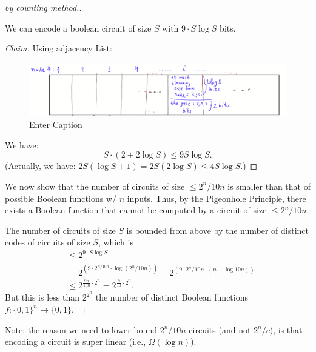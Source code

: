 \begin{proof}[by counting method.]
\mbox{}\\

\begin{claim}
We can encode a boolean circuit of size $S$ with $9\cdot S \log S$ bits.
\end{claim}

\begin{proof}[Claim]
Using adjacency List:
\begin{figure}[H]
    \centering
    \includegraphics[width=1.1\linewidth]{images/shannon_table.png}
    \caption{Enter Caption}
    \label{fig:enter-label}
\end{figure}




We have:
$$
S \cdot(2+2 \log S) \leq 9 S \log S
.$$
(Actually, we have: 
$ 2S(\log S+1) = 2S(2 \log S) \leq 4 S \log S.
$)
\end{proof}

We now show that the number of circuits of size $\leq 2^n / 10 n$ is smaller than that of possible Boolean functions w/ $n$ inputs.
Thus, by the Pigeonhole Principle, there exists a Boolean function that cannot be computed by a circuit of size $\leq 2^n / 10 n$.

The number of circuits of size $S$ is bounded from above by the number of distinct codes of circuits of size $S$, which is
$$
\begin{aligned}
& \leq 2^{9 \cdot S \log S} \\
& =2^{\left(9 \cdot 2^{n / 10 n} \cdot \log \left(2^n / 10 n\right)\right)}=2^{\left(9 \cdot 2^n / 10 n \cdot(n-\log 10 n)\right)} \\
& \leq 2^{\frac{9 n}{10 n} \cdot 2^n}=2^{\frac{9}{10} \cdot 2^n} . 
\end{aligned}
$$
But this is 
less than $2^{2^n}$ the number of distinct Boolean functions $f:\{0,1\}^n\to\{0,1\}$. 
\end{proof}

Note: the reason we need to lower bound $2^n/10n$ circuits (and not $2^n/c$), is that encoding a circuit is super linear (i.e., $\Omega (\log n)$).



